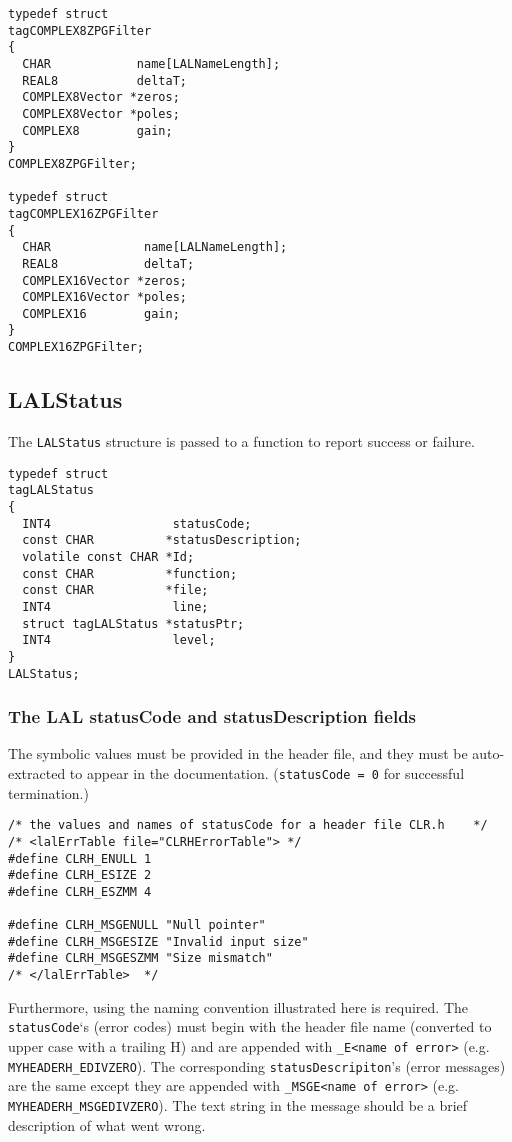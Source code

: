 \documentclass[]{ligodcc}
\renewcommand{\texttt}[1]{{\ttfamily\color{blue}#1}}
\begin{document}
{\footnotesize
\begin{verbatim}
typedef struct
tagCOMPLEX8ZPGFilter
{
  CHAR            name[LALNameLength];
  REAL8           deltaT;
  COMPLEX8Vector *zeros;
  COMPLEX8Vector *poles;
  COMPLEX8        gain;
}
COMPLEX8ZPGFilter;

typedef struct
tagCOMPLEX16ZPGFilter
{
  CHAR             name[LALNameLength];
  REAL8            deltaT;
  COMPLEX16Vector *zeros;
  COMPLEX16Vector *poles;
  COMPLEX16        gain;
}
COMPLEX16ZPGFilter;
\end{verbatim}}





\subsection{ {\texttt {LALStatus}}}
\label{ssec:lalstatus}

The {\tt LALStatus} structure is passed to a function to report
success or failure.
{\footnotesize
\begin{verbatim}
typedef struct
tagLALStatus
{
  INT4                 statusCode;
  const CHAR          *statusDescription;
  volatile const CHAR *Id;
  const CHAR          *function;
  const CHAR          *file;
  INT4                 line;
  struct tagLALStatus *statusPtr;
  INT4                 level;
}
LALStatus;
\end{verbatim}}

\subsubsection{The LAL {\texttt {statusCode}} and
{\texttt {statusDescription}} fields }

 The symbolic values must be provided in the header file, and they
must  be auto-extracted to appear in the documentation.
({\tt statusCode = 0} for successful termination.)

{\footnotesize
\begin{verbatim}
/* the values and names of statusCode for a header file CLR.h    */
/* <lalErrTable file="CLRHErrorTable"> */
#define CLRH_ENULL 1
#define CLRH_ESIZE 2
#define CLRH_ESZMM 4

#define CLRH_MSGENULL "Null pointer"
#define CLRH_MSGESIZE "Invalid input size"
#define CLRH_MSGESZMM "Size mismatch"
/* </lalErrTable>  */
\end{verbatim}}

Furthermore, using the naming convention illustrated here is required.
The  {\tt statusCode}`s (error codes) must begin with the header file name
(converted to upper case with a trailing H)  and are appended with
{\tt \_E<name of error>} (e.g. {\tt MYHEADERH\_EDIVZERO}). The
corresponding {\tt statusDescripiton}'s (error messages) are the same
except they are appended with {\tt \_MSGE<name of error>} (e.g. {\tt
MYHEADERH\_MSGEDIVZERO}).  The text string in the message should be a
brief description of what went wrong.
\end{document}
